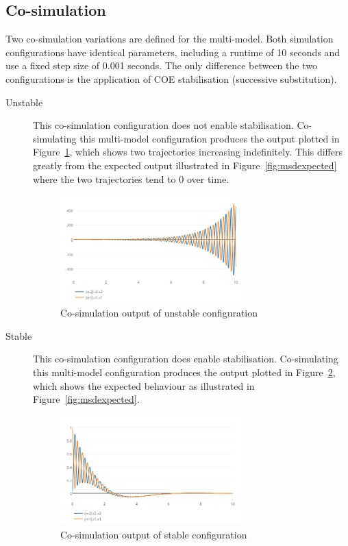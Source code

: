 \subsection{Co-simulation}
\label{sec:masspringdamper_co}

Two co-simulation variations are defined for the multi-model. Both simulation configurations have identical parameters, including a runtime of 10 seconds and use a fixed step size of 0.001 seconds. The only difference between the two configurations is the application of COE stabilisation (successive substitution).

\begin{description}
	\item[Unstable] This co-simulation configuration does not enable stabilisation. Co-simulating this multi-model configuration produces the output plotted in Figure~\ref{fig:msd_unstable}, which shows two trajectories increasing indefinitely. This differs greatly from the expected output illustrated in Figure~\ref{fig:msdexpected} where the two trajectories tend to 0 over time.

\begin{figure}[htbp]
	\begin{center}
		\includegraphics[width=0.7\textwidth]{massSpringDamper/massSpringDamperUnstable}
		\caption{Co-simulation output of unstable configuration}
		\label{fig:msd_unstable}
	\end{center}
\end{figure}

	\item[Stable] This co-simulation configuration does enable stabilisation. Co-simulating this multi-model configuration produces the output plotted in Figure~\ref{fig:msd_stable}, which shows the expected behaviour as illustrated in Figure~\ref{fig:msdexpected}.
	
\begin{figure}[htbp]
	\begin{center}
		\includegraphics[width=0.7\textwidth]{massSpringDamper/massSpringDamperStable}
		\caption{Co-simulation output of stable configuration}
		\label{fig:msd_stable}
	\end{center}
\end{figure}	
\end{description}
